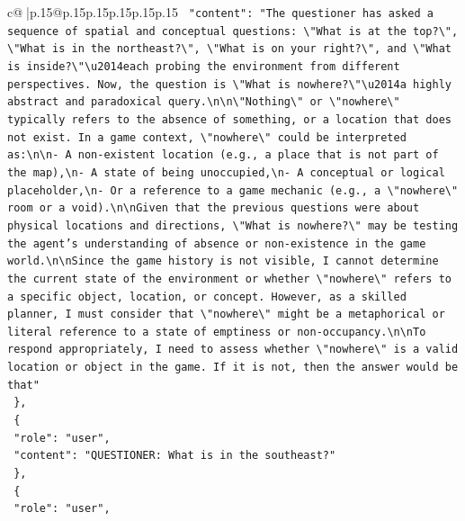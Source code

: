 \documentclass{article}
\begin{document}
{\begin{supertabular}{c@{$\;$}|p{.15\linewidth}@{}p{.15\linewidth}p{.15\linewidth}p{.15\linewidth}p{.15\linewidth}p{.15\linewidth}}
{{{\texttt{    "content": "The questioner has asked a sequence of spatial and conceptual questions: \textbackslash{}"What is at the top?\textbackslash{}", \textbackslash{}"What is in the northeast?\textbackslash{}", \textbackslash{}"What is on your right?\textbackslash{}", and \textbackslash{}"What is inside?\textbackslash{}"\textbackslash{}u2014each probing the environment from different perspectives. Now, the question is \textbackslash{}"What is nowhere?\textbackslash{}"\textbackslash{}u2014a highly abstract and paradoxical query.\textbackslash{}n\textbackslash{}n\textbackslash{}"Nothing\textbackslash{}" or \textbackslash{}"nowhere\textbackslash{}" typically refers to the absence of something, or a location that does not exist. In a game context, \textbackslash{}"nowhere\textbackslash{}" could be interpreted as:\textbackslash{}n\textbackslash{}n{-} A non{-}existent location (e.g., a place that is not part of the map),\textbackslash{}n{-} A state of being unoccupied,\textbackslash{}n{-} A conceptual or logical placeholder,\textbackslash{}n{-} Or a reference to a game mechanic (e.g., a \textbackslash{}"nowhere\textbackslash{}" room or a void).\textbackslash{}n\textbackslash{}nGiven that the previous questions were about physical locations and directions, \textbackslash{}"What is nowhere?\textbackslash{}" may be testing the agent's understanding of absence or non{-}existence in the game world.\textbackslash{}n\textbackslash{}nSince the game history is not visible, I cannot determine the current state of the environment or whether \textbackslash{}"nowhere\textbackslash{}" refers to a specific object, location, or concept. However, as a skilled planner, I must consider that \textbackslash{}"nowhere\textbackslash{}" might be a metaphorical or literal reference to a state of emptiness or non{-}occupancy.\textbackslash{}n\textbackslash{}nTo respond appropriately, I need to assess whether \textbackslash{}"nowhere\textbackslash{}" is a valid location or object in the game. If it is not, then the answer would be that"} \\
\texttt{  \},} \\
\texttt{  \{} \\
\texttt{    "role": "user",} \\
\texttt{    "content": "QUESTIONER: What is in the southeast?"} \\
\texttt{  \},} \\
\texttt{  \{} \\
\texttt{    "role": "user",} \\
}}}
\end{supertabular}}
\end{document}

